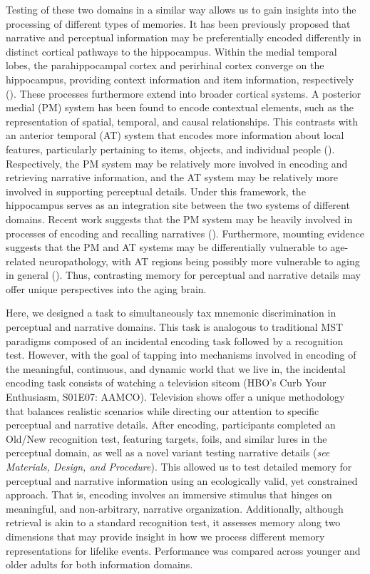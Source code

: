 \documentclass[11pt]{article}
\begin{document}
Testing of these two domains in a similar way allows us to gain insights into the processing of different types of memories. It has been previously proposed that narrative and perceptual information may be preferentially encoded differently in distinct cortical pathways to the hippocampus. Within the medial temporal lobes, the parahippocampal cortex and perirhinal cortex converge on the hippocampus, providing context information and item information, respectively (\cite{ranganath_binding_2010}). These processes furthermore extend into broader cortical systems. A posterior medial (PM) system has been found to encode contextual elements, such as the representation of spatial, temporal, and causal relationships. This contrasts with an anterior temporal (AT) system that encodes more information about local features, particularly pertaining to items, objects, and individual people (\cite{ranganath_two_2012, ritchey_cortico-hippocampal_2015, reagh_what_2018}). Respectively, the PM system may be relatively more involved in encoding and retrieving narrative information, and the AT system may be relatively more involved in supporting perceptual details. Under this framework, the hippocampus serves as an integration site between the two systems of different domains. Recent work suggests that the PM system may be heavily involved in processes of encoding and recalling narratives (\cite{chen_shared_2017, yeshurun_same_2017, lee_what_2020}). Furthermore, mounting evidence suggests that the PM and AT systems may be differentially vulnerable to age-related neuropathology, with AT regions being possibly more vulnerable to aging in general (\cite{maass_alzheimers_2019, reagh_functional_2018}). Thus, contrasting memory for perceptual and narrative details may offer unique perspectives into the aging brain.

Here, we designed a task to simultaneously tax mnemonic discrimination in perceptual and narrative domains. This task is analogous to traditional MST paradigms composed of an incidental encoding task followed by a recognition test. However, with the goal of tapping into mechanisms involved in encoding of the meaningful, continuous, and dynamic world that we live in, the incidental encoding task consists of watching a television sitcom (HBO’s Curb Your Enthusiasm, S01E07: AAMCO). Television shows offer a unique methodology that balances realistic scenarios while directing our attention to specific perceptual and narrative details. After encoding, participants completed an Old/New recognition test, featuring targets, foils, and similar lures in the perceptual domain, as well as a novel variant testing narrative details (\textit{see Materials, Design, and Procedure}). This allowed us to test detailed memory for perceptual and narrative information using an ecologically valid, yet constrained approach. That is, encoding involves an immersive stimulus that hinges on meaningful, and non-arbitrary, narrative organization. Additionally, although retrieval is akin to a standard recognition test, it assesses memory along two dimensions that may provide insight in how we process different memory representations for lifelike events. Performance was compared across younger and older adults for both information domains.
\end{document}
